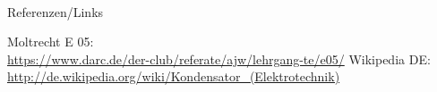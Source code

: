\renewcommand{\refname}{Referenzen}

\hypertarget{refs}{}
\textcolor{white}{} \\ %
\Large Referenzen/Links
\footnotesize

\begin{thebibliography}{}
     Moltrecht E 05: \\
    \url{https://www.darc.de/der-club/referate/ajw/lehrgang-te/e05/}
      Wikipedia DE: \\
    \url{http://de.wikipedia.org/wiki/Kondensator_(Elektrotechnik)}\\
\end{thebibliography}


